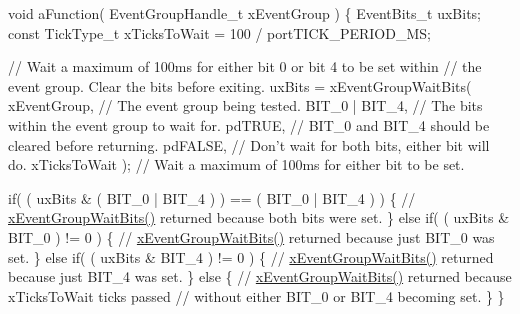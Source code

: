 \begin{DoxyPre}  void aFunction( EventGroupHandle\_t xEventGroup )
  \{
  EventBits\_t uxBits;
  const TickType\_t xTicksToWait = 100 / portTICK\_PERIOD\_MS;\end{DoxyPre}



\begin{DoxyPre}    // Wait a maximum of 100ms for either bit 0 or bit 4 to be set within
    // the event group.  Clear the bits before exiting.
    uxBits = xEventGroupWaitBits(
                xEventGroup,    // The event group being tested.
                BIT\_0 | BIT\_4,  // The bits within the event group to wait for.
                pdTRUE,         // BIT\_0 and BIT\_4 should be cleared before returning.
                pdFALSE,        // Don't wait for both bits, either bit will do.
                xTicksToWait ); // Wait a maximum of 100ms for either bit to be set.\end{DoxyPre}



\begin{DoxyPre}    if( ( uxBits \& ( BIT\_0 | BIT\_4 ) ) == ( BIT\_0 | BIT\_4 ) )
    \{
        // \hyperlink{event__groups_8h_aab9d5b405bc57b7624dcabe9a9a503db}{xEventGroupWaitBits()} returned because both bits were set.
    \}
    else if( ( uxBits \& BIT\_0 ) != 0 )
    \{
        // \hyperlink{event__groups_8h_aab9d5b405bc57b7624dcabe9a9a503db}{xEventGroupWaitBits()} returned because just BIT\_0 was set.
    \}
    else if( ( uxBits \& BIT\_4 ) != 0 )
    \{
        // \hyperlink{event__groups_8h_aab9d5b405bc57b7624dcabe9a9a503db}{xEventGroupWaitBits()} returned because just BIT\_4 was set.
    \}
    else
    \{
        // \hyperlink{event__groups_8h_aab9d5b405bc57b7624dcabe9a9a503db}{xEventGroupWaitBits()} returned because xTicksToWait ticks passed
        // without either BIT\_0 or BIT\_4 becoming set.
    \}
  \}
  \end{DoxyPre}
 